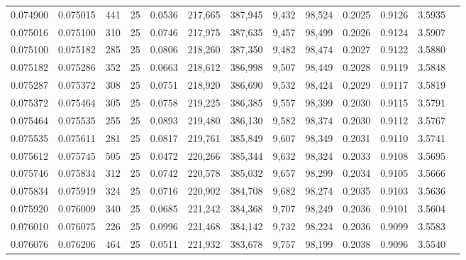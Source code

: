 \begin{tabular}{rrrrrrrrrrrrr}
0.074900 & 0.075015 &   441 &  25 &                                     0.0536 & 217,665 & 387,945 &   9,432 &  98,524 & 0.2025 & 0.9126 & 3.5935 \\
0.075016 & 0.075100 &   310 &  25 &                                     0.0746 & 217,975 & 387,635 &   9,457 &  98,499 & 0.2026 & 0.9124 & 3.5907 \\
0.075100 & 0.075182 &   285 &  25 &                                     0.0806 & 218,260 & 387,350 &   9,482 &  98,474 & 0.2027 & 0.9122 & 3.5880 \\
0.075182 & 0.075286 &   352 &  25 &                                     0.0663 & 218,612 & 386,998 &   9,507 &  98,449 & 0.2028 & 0.9119 & 3.5848 \\
0.075287 & 0.075372 &   308 &  25 &                                     0.0751 & 218,920 & 386,690 &   9,532 &  98,424 & 0.2029 & 0.9117 & 3.5819 \\
0.075372 & 0.075464 &   305 &  25 &                                     0.0758 & 219,225 & 386,385 &   9,557 &  98,399 & 0.2030 & 0.9115 & 3.5791 \\
0.075464 & 0.075535 &   255 &  25 &                                     0.0893 & 219,480 & 386,130 &   9,582 &  98,374 & 0.2030 & 0.9112 & 3.5767 \\
0.075535 & 0.075611 &   281 &  25 &                                     0.0817 & 219,761 & 385,849 &   9,607 &  98,349 & 0.2031 & 0.9110 & 3.5741 \\
0.075612 & 0.075745 &   505 &  25 &                                     0.0472 & 220,266 & 385,344 &   9,632 &  98,324 & 0.2033 & 0.9108 & 3.5695 \\
0.075746 & 0.075834 &   312 &  25 &                                     0.0742 & 220,578 & 385,032 &   9,657 &  98,299 & 0.2034 & 0.9105 & 3.5666 \\
0.075834 & 0.075919 &   324 &  25 &                                     0.0716 & 220,902 & 384,708 &   9,682 &  98,274 & 0.2035 & 0.9103 & 3.5636 \\
0.075920 & 0.076009 &   340 &  25 &                                     0.0685 & 221,242 & 384,368 &   9,707 &  98,249 & 0.2036 & 0.9101 & 3.5604 \\
0.076010 & 0.076075 &   226 &  25 &                                     0.0996 & 221,468 & 384,142 &   9,732 &  98,224 & 0.2036 & 0.9099 & 3.5583 \\
0.076076 & 0.076206 &   464 &  25 &                                     0.0511 & 221,932 & 383,678 &   9,757 &  98,199 & 0.2038 & 0.9096 & 3.5540 \\

\end{tabular}
